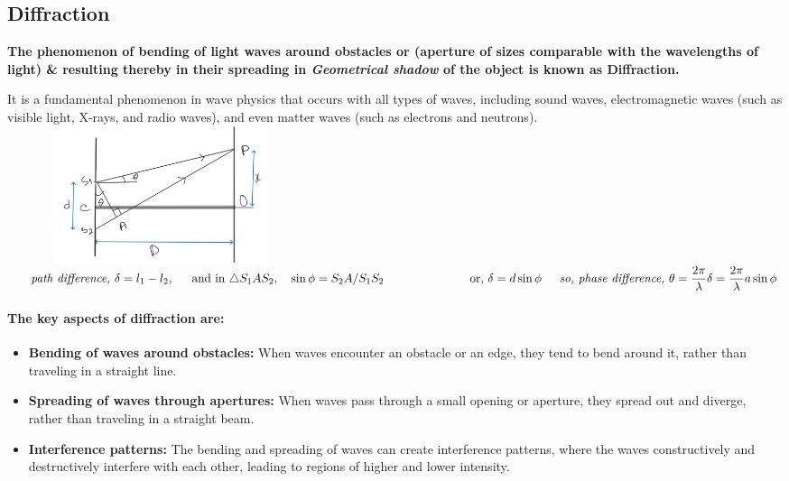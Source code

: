 \documentclass[legalpaper,10pt]{article}
\begin{document}
\begin{multicols*}{2}
		\section*{Diffraction}
		\textbf{The phenomenon of bending of light waves around obstacles or (aperture of sizes comparable with the wavelengths of light) \& resulting thereby in their spreading in \textit{Geometrical shadow} of the object is known as Diffraction.}
		\par It is a fundamental phenomenon in wave physics that occurs with all types of waves, including sound waves, electromagnetic waves (such as visible light, X-rays, and radio waves), and even matter waves (such as electrons and neutrons).\\
		\includegraphics[width=9cm,height=4cm]{difraction.png}
		\begin{math}
			\\\indent\textit{path difference, }\delta=l_1-l_2,
			\\\indent\text{and in }\triangle S_1AS_2, \quad \sin{\phi}=S_2A/{S_1S_2}
			\\\indent\hspace*{2cm} \text{or, }\delta=d\sin{\phi}
			\\\indent\textit{so, phase difference, }\theta=\dfrac{2\pi}{\lambda}\delta=\dfrac{2\pi}{\lambda} a\sin{\phi}
		\end{math}
		\paragraph{\large The key aspects of diffraction are:}
		\begin{itemize}
			\item \textbf{Bending of waves around obstacles:} When waves encounter an obstacle or an edge, they tend to bend around it, rather than traveling in a straight line.
			\item \textbf{Spreading of waves through apertures:} When waves pass through a small opening or aperture, they spread out and diverge, rather than traveling in a straight beam.
			\item \textbf{Interference patterns:} The bending and spreading of waves can create interference patterns, where the waves constructively and destructively interfere with each other, leading to regions of higher and lower intensity.
		\end{itemize}

\end{multicols*}
\end{document}
